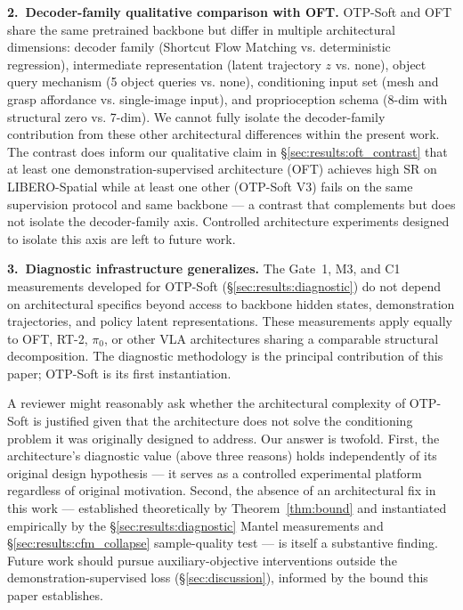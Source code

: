 \textbf{2.~Decoder-family qualitative comparison with OFT.} OTP-Soft and OFT share the
same pretrained backbone but differ in multiple architectural dimensions: decoder family
(Shortcut Flow Matching vs. deterministic regression), intermediate representation (latent
trajectory $z$ vs. none), object query mechanism (5 object queries vs. none), conditioning
input set (mesh and grasp affordance vs. single-image input), and proprioception schema
(8-dim with structural zero vs. 7-dim). We cannot fully isolate the decoder-family
contribution from these other architectural differences within the present work. The
contrast does inform our qualitative claim in \S\ref{sec:results:oft_contrast} that at
least one demonstration-supervised architecture (OFT) achieves high SR on LIBERO-Spatial
while at least one other (OTP-Soft V3) fails on the same supervision protocol and same
backbone --- a contrast that complements but does not isolate the decoder-family axis.
Controlled architecture experiments designed to isolate this axis are left to future work.

\textbf{3.~Diagnostic infrastructure generalizes.} The Gate~1, M3, and C1 measurements
developed for OTP-Soft (\S\ref{sec:results:diagnostic}) do not depend on architectural
specifics beyond access to backbone hidden states, demonstration trajectories, and policy
latent representations. These measurements apply equally to OFT, RT-2, $\pi_0$, or other
VLA architectures sharing a comparable structural decomposition. The diagnostic
methodology is the principal contribution of this paper; OTP-Soft is its first
instantiation.

A reviewer might reasonably ask whether the architectural complexity of OTP-Soft is
justified given that the architecture does not solve the conditioning problem it was
originally designed to address. Our answer is twofold. First, the architecture's
diagnostic value (above three reasons) holds independently of its original design
hypothesis --- it serves as a controlled experimental platform regardless of original
motivation. Second, the absence of an architectural fix in this work --- established
theoretically by Theorem~\ref{thm:bound} and instantiated empirically by the
\S\ref{sec:results:diagnostic} Mantel measurements and \S\ref{sec:results:cfm_collapse}
sample-quality test --- is itself a substantive finding. Future work should pursue
auxiliary-objective interventions outside the demonstration-supervised loss
(\S\ref{sec:discussion}), informed by the bound this paper establishes.
